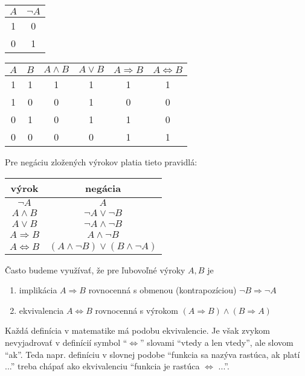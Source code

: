 \begin{center}
  \begin{tabular}{|c|c|}
    \hline
    $A$ & $\neg A$ \\
    \hline
    1 & 0 \\
    0 & 1 \\
    \hline
  \end{tabular}
  \quad
  \begin{tabular}{|c|c|c|c|c|c|}
    \hline
    $A$ & $B$ & $A \land B$ & $A \lor B$ & $A \Rightarrow B$ & $A \iff B$ \\
    \hline
    1 & 1 & 1 & 1 & 1 & 1 \\
    1 & 0 & 0 & 1 & 0 & 0 \\
    0 & 1 & 0 & 1 & 1 & 0 \\
    0 & 0 & 0 & 0 & 1 & 1 \\
    \hline
  \end{tabular}
\end{center}

Pre negáciu zložených výrokov platia tieto pravidlá:

\begin{center}
  \begin{tabular}{c | c}
    výrok & negácia \\
    \hline
    $\neg A$ & $A$ \\
    $A \land B$ & $\neg A \lor \neg B$ \\
    $A \lor B$ & $\neg A \land \neg B$ \\
    $A \Rightarrow B$ & $A \land \neg B$ \\
    $A \iff B$ & $(A \land \neg B) \lor (B \land \neg A)$ \\
  \end{tabular}
\end{center}

Často budeme využívať, že pre ľubovoľné výroky $A, B$ je

\begin{enumerate}
  \item implikácia $A \Rightarrow B$ rovnocenná s obmenou (kontrapozíciou)
        $\neg B \Rightarrow \neg A$
  \item ekvivalencia $A \iff B$ rovnocenná s výrokom
        $(A \Rightarrow B) \land (B \Rightarrow A)$
\end{enumerate}

Každá definícia v matematike má podobu ekvivalencie. Je však zvykom
nevyjadrovať v definícií symbol \enquote{$\iff$} slovami \enquote{vtedy a len
vtedy}, ale slovom \enquote{ak}. Teda napr. definíciu v slovnej podobe
\enquote{funkcia sa nazýva rastúca, ak platí ...} treba chápať ako ekvivalenciu
\enquote{funkcia je rastúca $\iff$ ...}.

